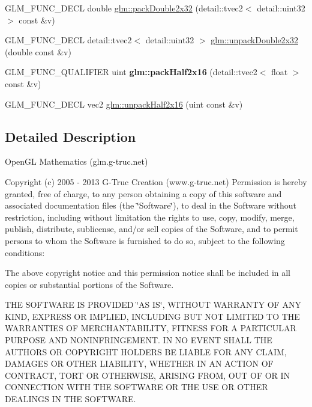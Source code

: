 \begin{DoxyCompactItemize}
\item 
G\+L\+M\+\_\+\+F\+U\+N\+C\+\_\+\+D\+E\+C\+L double \hyperlink{group__core__func__packing_ga3b29a2a13aeb1e9118d4a7f03597228e}{glm\+::pack\+Double2x32} (detail\+::tvec2$<$ detail\+::uint32 $>$ const \&v)
\item 
G\+L\+M\+\_\+\+F\+U\+N\+C\+\_\+\+D\+E\+C\+L detail\+::tvec2$<$ detail\+::uint32 $>$ \hyperlink{group__core__func__packing_gaf1e3ad4a924977b175913ed935958b71}{glm\+::unpack\+Double2x32} (double const \&v)
\item 
\hypertarget{namespaceglm_af8aa8303c4d1547b8a847620045e31f8}{}G\+L\+M\+\_\+\+F\+U\+N\+C\+\_\+\+Q\+U\+A\+L\+I\+F\+I\+E\+R uint {\bfseries glm\+::pack\+Half2x16} (detail\+::tvec2$<$ float $>$ const \&v)\label{namespaceglm_af8aa8303c4d1547b8a847620045e31f8}

\item 
G\+L\+M\+\_\+\+F\+U\+N\+C\+\_\+\+D\+E\+C\+L vec2 \hyperlink{group__core__func__packing_ga4051804cc2c930ba4ca73382b79edf1d}{glm\+::unpack\+Half2x16} (uint const \&v)
\end{DoxyCompactItemize}


\subsection{Detailed Description}
Open\+G\+L Mathematics (glm.\+g-\/truc.\+net)

Copyright (c) 2005 -\/ 2013 G-\/\+Truc Creation (www.\+g-\/truc.\+net) Permission is hereby granted, free of charge, to any person obtaining a copy of this software and associated documentation files (the \char`\"{}\+Software\char`\"{}), to deal in the Software without restriction, including without limitation the rights to use, copy, modify, merge, publish, distribute, sublicense, and/or sell copies of the Software, and to permit persons to whom the Software is furnished to do so, subject to the following conditions\+:

The above copyright notice and this permission notice shall be included in all copies or substantial portions of the Software.

T\+H\+E S\+O\+F\+T\+W\+A\+R\+E I\+S P\+R\+O\+V\+I\+D\+E\+D \char`\"{}\+A\+S I\+S\char`\"{}, W\+I\+T\+H\+O\+U\+T W\+A\+R\+R\+A\+N\+T\+Y O\+F A\+N\+Y K\+I\+N\+D, E\+X\+P\+R\+E\+S\+S O\+R I\+M\+P\+L\+I\+E\+D, I\+N\+C\+L\+U\+D\+I\+N\+G B\+U\+T N\+O\+T L\+I\+M\+I\+T\+E\+D T\+O T\+H\+E W\+A\+R\+R\+A\+N\+T\+I\+E\+S O\+F M\+E\+R\+C\+H\+A\+N\+T\+A\+B\+I\+L\+I\+T\+Y, F\+I\+T\+N\+E\+S\+S F\+O\+R A P\+A\+R\+T\+I\+C\+U\+L\+A\+R P\+U\+R\+P\+O\+S\+E A\+N\+D N\+O\+N\+I\+N\+F\+R\+I\+N\+G\+E\+M\+E\+N\+T. I\+N N\+O E\+V\+E\+N\+T S\+H\+A\+L\+L T\+H\+E A\+U\+T\+H\+O\+R\+S O\+R C\+O\+P\+Y\+R\+I\+G\+H\+T H\+O\+L\+D\+E\+R\+S B\+E L\+I\+A\+B\+L\+E F\+O\+R A\+N\+Y C\+L\+A\+I\+M, D\+A\+M\+A\+G\+E\+S O\+R O\+T\+H\+E\+R L\+I\+A\+B\+I\+L\+I\+T\+Y, W\+H\+E\+T\+H\+E\+R I\+N A\+N A\+C\+T\+I\+O\+N O\+F C\+O\+N\+T\+R\+A\+C\+T, T\+O\+R\+T O\+R O\+T\+H\+E\+R\+W\+I\+S\+E, A\+R\+I\+S\+I\+N\+G F\+R\+O\+M, O\+U\+T O\+F O\+R I\+N C\+O\+N\+N\+E\+C\+T\+I\+O\+N W\+I\+T\+H T\+H\+E S\+O\+F\+T\+W\+A\+R\+E O\+R T\+H\+E U\+S\+E O\+R O\+T\+H\+E\+R D\+E\+A\+L\+I\+N\+G\+S I\+N T\+H\+E S\+O\+F\+T\+W\+A\+R\+E.

